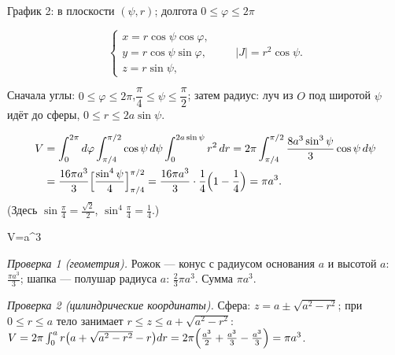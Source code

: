 \begin{center}
\begin{minipage}[t]{0.49\linewidth}
\small График 2: в плоскости $(\psi,r)$; долгота $0\leqslant\varphi\leqslant2\pi$
\end{minipage}
\end{center}

\[
\begin{cases}x=r\cos\psi\cos\varphi,\\ y=r\cos\psi\sin\varphi,\\ z=r\sin\psi,\end{cases}\qquad |J|=r^2\cos\psi .
\]

Сначала углы: $0\leqslant\varphi\leqslant2\pi$,\quad $\dfrac\pi4\leqslant\psi\leqslant\dfrac\pi2$; затем радиус: луч из $O$ под широтой $\psi$ идёт до сферы, $0\leqslant r\leqslant2a\sin\psi$.

\[
\begin{aligned}V&=\int_0^{2\pi}d\varphi\int_{\pi/4}^{\pi/2}\cos\psi\,d\psi\int_0^{2a\sin\psi}r^2\,dr
=2\pi\int_{\pi/4}^{\pi/2}\frac{8a^3\sin^3\psi}{3}\cos\psi\,d\psi\\
&=\frac{16\pi a^3}{3}\Bigl[\frac{\sin^4\psi}{4}\Bigr]_{\pi/4}^{\pi/2}
=\frac{16\pi a^3}{3}\cdot\frac14\Bigl(1-\frac14\Bigr)=\pi a^3 .\end{aligned}
\]
(Здесь $\sin\frac\pi4=\frac{\sqrt2}{2}$, $\sin^4\frac\pi4=\frac14$.)

\begin{answerbox}
V=\pi a^3
\end{answerbox}

\emph{Проверка 1 (геометрия).} Рожок --- конус с радиусом основания $a$ и высотой $a$: $\frac{\pi a^3}{3}$; шапка --- полушар радиуса $a$: $\frac23\pi a^3$. Сумма $\pi a^3$. \checkmark

\emph{Проверка 2 (цилиндрические координаты).} Сфера: $z=a\pm\sqrt{a^2-r^2}$; при $0\leqslant r\leqslant a$ тело занимает $r\leqslant z\leqslant a+\sqrt{a^2-r^2}$:
$V=2\pi\int_0^ar\bigl(a+\sqrt{a^2-r^2}-r\bigr)dr=2\pi\Bigl(\frac{a^3}{2}+\frac{a^3}{3}-\frac{a^3}{3}\Bigr)=\pi a^3$. \checkmark


